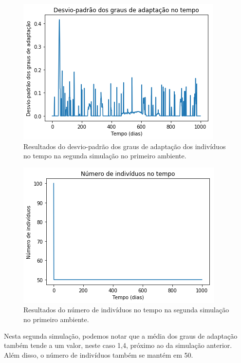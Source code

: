 \documentclass[10pt,brazil,english]{article}
\begin{document}
        \begin{figure}[!hbtp]
            \begin{center}
                \includegraphics[scale=0.5]{Images/1-5.png}
            \end{center}
            \caption{Resultados do desvio-padrão dos graus de adaptação dos indivíduos no tempo na segunda simulação no primeiro ambiente.}
            \label{Fig5}
        \end{figure} 
        
        \begin{figure}[!hbtp]
            \begin{center}
                \includegraphics[scale=0.5]{Images/1-6.png}
            \end{center}
            \caption{Resultados do número de indivíduos no tempo na segunda simulação no primeiro ambiente.}
            \label{Fig6}
        \end{figure}
        
        Nesta segunda simulação, podemos notar que a média dos graus de adaptação também tende a um valor, neste caso 1,4, próximo ao da simulação anterior. Além disso, o número de indivíduos também se mantém em 50.
        
\end{document}
